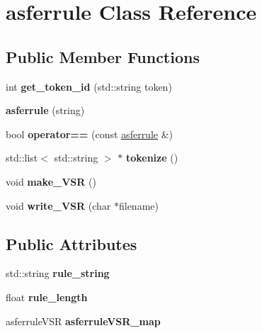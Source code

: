 \hypertarget{classasferrule}{\section{asferrule Class Reference}
\label{classasferrule}
}
\subsection*{Public Member Functions}
\begin{DoxyCompactItemize}
\item 
\hypertarget{classasferrule_a2057dd301a25ea92f3fda743c296ccbf}{int {\bfseries get\-\_\-token\-\_\-id} (std\-::string token)}\label{classasferrule_a2057dd301a25ea92f3fda743c296ccbf}

\item 
\hypertarget{classasferrule_accb72f0e1b742071a7aa45a80c453b8f}{{\bfseries asferrule} (string)}\label{classasferrule_accb72f0e1b742071a7aa45a80c453b8f}

\item 
\hypertarget{classasferrule_a26b497aa6bdd099e748b1009d03e93bc}{bool {\bfseries operator==} (const \hyperlink{classasferrule}{asferrule} \&)}\label{classasferrule_a26b497aa6bdd099e748b1009d03e93bc}

\item 
\hypertarget{classasferrule_a9b6f845cbf27adabfeb4b3eb9fb7e2dd}{std\-::list$<$ std\-::string $>$ $\ast$ {\bfseries tokenize} ()}\label{classasferrule_a9b6f845cbf27adabfeb4b3eb9fb7e2dd}

\item 
\hypertarget{classasferrule_a397caca52c3038fcdcaf695f28290b41}{void {\bfseries make\-\_\-\-V\-S\-R} ()}\label{classasferrule_a397caca52c3038fcdcaf695f28290b41}

\item 
\hypertarget{classasferrule_a78b844bb3f0d9a0464a6b8cb4e0e85ac}{void {\bfseries write\-\_\-\-V\-S\-R} (char $\ast$filename)}\label{classasferrule_a78b844bb3f0d9a0464a6b8cb4e0e85ac}

\end{DoxyCompactItemize}
\subsection*{Public Attributes}
\begin{DoxyCompactItemize}
\item 
\hypertarget{classasferrule_ac7c5a7a383821a2f4e894fe52d0087d8}{std\-::string {\bfseries rule\-\_\-string}}\label{classasferrule_ac7c5a7a383821a2f4e894fe52d0087d8}

\item 
\hypertarget{classasferrule_afdd8fd18199f0ac78bf5f5d5d48b7072}{float {\bfseries rule\-\_\-length}}\label{classasferrule_afdd8fd18199f0ac78bf5f5d5d48b7072}

\item 
\hypertarget{classasferrule_a2a99e3a76175f8fa88c1f7c12466998e}{asferrule\-V\-S\-R {\bfseries asferrule\-V\-S\-R\-\_\-map}}\label{classasferrule_a2a99e3a76175f8fa88c1f7c12466998e}

\end{DoxyCompactItemize}

